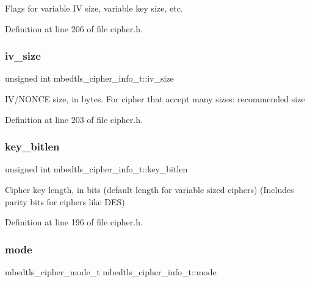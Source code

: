Flags for variable IV size, variable key size, etc. 

Definition at line 206 of file cipher.\+h.

\mbox{\label{structmbedtls__cipher__info__t_a3416bc1e18e1694da17bc922f152b20d}} 
\subsubsection{\texorpdfstring{iv\+\_\+size}{iv\_size}}
{\footnotesize\ttfamily unsigned int mbedtls\+\_\+cipher\+\_\+info\+\_\+t\+::iv\+\_\+size}

I\+V/\+N\+O\+N\+CE size, in bytes. For cipher that accept many sizes\+: recommended size 

Definition at line 203 of file cipher.\+h.

\mbox{\label{structmbedtls__cipher__info__t_a21ac3fc6bf536ce16f1754301e7fe3c9}} 
\subsubsection{\texorpdfstring{key\+\_\+bitlen}{key\_bitlen}}
{\footnotesize\ttfamily unsigned int mbedtls\+\_\+cipher\+\_\+info\+\_\+t\+::key\+\_\+bitlen}

Cipher key length, in bits (default length for variable sized ciphers) (Includes parity bits for ciphers like D\+ES) 

Definition at line 196 of file cipher.\+h.

\mbox{\label{structmbedtls__cipher__info__t_a6603375900f4834ae6c91e305aef34f6}} 
\subsubsection{\texorpdfstring{mode}{mode}}
{\footnotesize\ttfamily mbedtls\+\_\+cipher\+\_\+mode\+\_\+t mbedtls\+\_\+cipher\+\_\+info\+\_\+t\+::mode}

